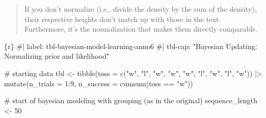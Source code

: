 \documentclass[
  letterpaper,
  DIV=11,
  numbers=noendperiod]{scrreprt}
\newenvironment{Shaded}{\begin{snugshade}}{\end{snugshade}}
\newcommand{\AttributeTok}[1]{\textcolor[rgb]{0.40,0.45,0.13}{#1}}
\newcommand{\CommentTok}[1]{\textcolor[rgb]{0.37,0.37,0.37}{#1}}
\newcommand{\DecValTok}[1]{\textcolor[rgb]{0.68,0.00,0.00}{#1}}
\newcommand{\FunctionTok}[1]{\textcolor[rgb]{0.28,0.35,0.67}{#1}}
\newcommand{\InformationTok}[1]{\textcolor[rgb]{0.37,0.37,0.37}{#1}}
\newcommand{\NormalTok}[1]{\textcolor[rgb]{0.00,0.23,0.31}{#1}}
\newcommand{\OtherTok}[1]{\textcolor[rgb]{0.00,0.23,0.31}{#1}}
\newcommand{\SpecialCharTok}[1]{\textcolor[rgb]{0.37,0.37,0.37}{#1}}
\newcommand{\StringTok}[1]{\textcolor[rgb]{0.13,0.47,0.30}{#1}}
\begin{document}
\begin{quote}
If you don't normalize (i.e., divide the density by the sum of the
density), their respective heights don't match up with those in the
text. Furthermore, it's the normalization that makes them directly
comparable.
\end{quote}

\begin{Shaded}
\begin{Highlighting}[]
\InformationTok{\textasciigrave{}\textasciigrave{}\textasciigrave{}\{r\}}
\CommentTok{\#| label: tbl{-}bayesian{-}model{-}learning{-}anno6}
\CommentTok{\#| tbl{-}cap: "Bayesian Updating: Normalizing prior and likelihood"}

\CommentTok{\# starting data}
\NormalTok{tbl }\OtherTok{\textless{}{-}} \FunctionTok{tibble}\NormalTok{(}\AttributeTok{toss =} \FunctionTok{c}\NormalTok{(}\StringTok{"w"}\NormalTok{, }\StringTok{"l"}\NormalTok{, }\StringTok{"w"}\NormalTok{, }\StringTok{"w"}\NormalTok{, }\StringTok{"w"}\NormalTok{, }\StringTok{"l"}\NormalTok{, }\StringTok{"w"}\NormalTok{, }\StringTok{"l"}\NormalTok{, }\StringTok{"w"}\NormalTok{)) }\SpecialCharTok{|\textgreater{}} 
    \FunctionTok{mutate}\NormalTok{(}\AttributeTok{n\_trials  =} \DecValTok{1}\SpecialCharTok{:}\DecValTok{9}\NormalTok{, }\AttributeTok{n\_success =} \FunctionTok{cumsum}\NormalTok{(toss }\SpecialCharTok{==} \StringTok{"w"}\NormalTok{))}

\CommentTok{\# start of bayesian modeling with grouping (as in the original)}
\NormalTok{sequence\_length }\OtherTok{\textless{}{-}} \DecValTok{50}


\end{Highlighting}
\end{Shaded}
\end{document}
